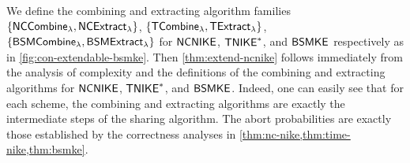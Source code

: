 We define the combining and extracting algorithm families $\{\mathsf{NCCombine}_{\lambda},\allowbreak\mathsf{NCExtract}_{\lambda}\}$, $\{\mathsf{TCombine}_{\lambda},\allowbreak\mathsf{TExtract}_{\lambda}\}$, $\{\mathsf{BSMCombine}_{\lambda},\mathsf{BSMExtract}_{\lambda}\}$ for ${\mathsf{NCNIKE}}$, $\mathsf{TNIKE}^*$, and ${\mathsf{BSMKE}}$ respectively as in \cref{fig:con-extendable-bsmke}.
Then \cref{thm:extend-ncnike} follows immediately from the analysis of complexity and the definitions of the combining and extracting algorithms for ${\mathsf{NCNIKE}}$, $\mathsf{TNIKE}^*$, and ${\mathsf{BSMKE}}$. Indeed, one can easily see that for each scheme, the combining and extracting algorithms are exactly the intermediate steps of the sharing algorithm. The abort probabilities are exactly those established by the correctness analyses in \cref{thm:nc-nike,thm:time-nike,thm:bsmke}. %

